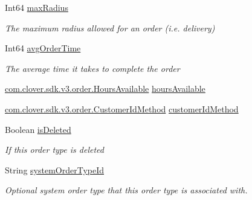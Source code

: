 \begin{DoxyCompactItemize}
Int64 \hyperlink{classcom_1_1clover_1_1sdk_1_1v3_1_1order_1_1_order_type_a40a68ca94893200a449094ead4e0b36c}{max\+Radius}
\begin{DoxyCompactList}\small\item\em The maximum radius allowed for an order (i.\+e. delivery) \end{DoxyCompactList}\item 
Int64 \hyperlink{classcom_1_1clover_1_1sdk_1_1v3_1_1order_1_1_order_type_a8e608366a9f8370cc4f9439a1f2561cd}{avg\+Order\+Time}
\begin{DoxyCompactList}\small\item\em The average time it takes to complete the order \end{DoxyCompactList}\item 
\hyperlink{namespacecom_1_1clover_1_1sdk_1_1v3_1_1order_adda3ca304970ac1775eb37a3d8f3b829}{com.\+clover.\+sdk.\+v3.\+order.\+Hours\+Available} \hyperlink{classcom_1_1clover_1_1sdk_1_1v3_1_1order_1_1_order_type_a31b60bf99eb43e3c0302d3ab9d32293f}{hours\+Available}
\item 
\hyperlink{namespacecom_1_1clover_1_1sdk_1_1v3_1_1order_afc10d003bf89af56702a924943b43e70}{com.\+clover.\+sdk.\+v3.\+order.\+Customer\+Id\+Method} \hyperlink{classcom_1_1clover_1_1sdk_1_1v3_1_1order_1_1_order_type_a063b2f005d99c92308c43f3e71710d8a}{customer\+Id\+Method}
\item 
Boolean \hyperlink{classcom_1_1clover_1_1sdk_1_1v3_1_1order_1_1_order_type_ac547d98bca59539fcc7ae4dc015c1201}{is\+Deleted}
\begin{DoxyCompactList}\small\item\em If this order type is deleted \end{DoxyCompactList}\item 
String \hyperlink{classcom_1_1clover_1_1sdk_1_1v3_1_1order_1_1_order_type_a3d624aaa8bb7801d62b3a1008bd18b8b}{system\+Order\+Type\+Id}
\begin{DoxyCompactList}\small\item\em Optional system order type that this order type is associated with. \end{DoxyCompactList}\item 

\end{DoxyCompactItemize}
